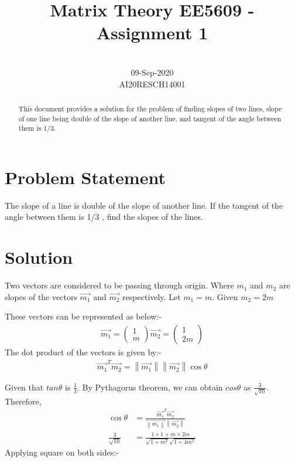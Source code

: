 \documentclass[conference]{IEEEtran}
\newcommand{\myvec}[1]{\ensuremath{\begin{pmatrix}#1\end{pmatrix}}}
\newcommand{\norm}[1]{\left\lVert#1\right\rVert}
\begin{document}
\title{Matrix Theory EE5609 - Assignment 1\\ 
}

\author{
 \\
09-Sep-2020\\
AI20RESCH14001\\
 }

\maketitle

\begin{abstract}
This document provides a solution for the problem of finding slopes of two lines,  slope of one line being double of the slope of another line. and tangent of the angle between them is 1/3.
\end{abstract}

\section{Problem Statement}
The slope of a line is double of the slope of another line. If the tangent of the angle between them is 1/3 , find the slopes of the lines.

\section{Solution}
Two vectors are considered to be passing through origin. Where  $m_{1}$   and  $ m_{2}$ are slopes of the vectors $\vec{m_{1}}$   and    $\vec{m_{2}}$ respectively.
Let  $m_{1} = m$. Given  $m_{2} = 2m$

These vectors can be represented as below:-
\begin{align}
\vec{m_{1}} =\myvec{ 1 \\m }
\vec{m_{2}} =\myvec{1\\2m}
 \end{align}
The dot product of the vectors is given by:-
\begin{align}
 \vec{m_{1}} ^T  \vec{m_{2}} = \norm{  \vec{ m_{1}}}\norm{  \vec{m_{2}}}  \cos \theta
\end{align}

Given that $tan \theta$ is $\frac{1}{3}$. By Pythagorus theorem, we can obtain $cos \theta$ as $\frac{3}{\sqrt{10}}$.
Therefore,
\begin{align}
\cos \theta &= \frac{\vec{m_{1}}^T  \vec{m_{2}}}{\vec{\norm{ m_{1}}} \norm{ \vec{m_{2}}}}\\
\frac{3}{\sqrt{10}} &=  \frac{1 \times 1 + {m \times 2m}}{{\sqrt{1 + m^2}\sqrt{1 +4 m^2}}}
\end{align}
Applying square on both sides:-
\end{document}
